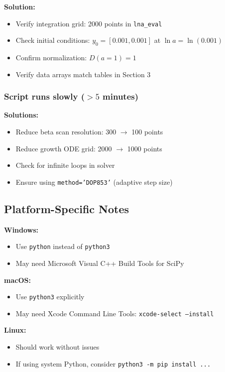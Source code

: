\documentclass[11pt]{article}
\begin{document}
\textbf{Solution:}
\begin{itemize}
    \item Verify integration grid: 2000 points in \texttt{lna\_eval}
    \item Check initial conditions: $y_0 = [0.001, 0.001]$ at $\ln a = \ln(0.001)$
    \item Confirm normalization: $D(a=1) = 1$
    \item Verify data arrays match tables in Section 3
\end{itemize}

\subsubsection{Script runs slowly ($>5$ minutes)}

\textbf{Solutions:}
\begin{itemize}
    \item Reduce beta scan resolution: 300 $\to$ 100 points
    \item Reduce growth ODE grid: 2000 $\to$ 1000 points
    \item Check for infinite loops in solver
    \item Ensure using \texttt{method='DOP853'} (adaptive step size)
\end{itemize}

\subsection{Platform-Specific Notes}

\textbf{Windows:}
\begin{itemize}
    \item Use \texttt{python} instead of \texttt{python3}
    \item May need Microsoft Visual C++ Build Tools for SciPy
\end{itemize}

\textbf{macOS:}
\begin{itemize}
    \item Use \texttt{python3} explicitly
    \item May need Xcode Command Line Tools: \texttt{xcode-select --install}
\end{itemize}

\textbf{Linux:}
\begin{itemize}
    \item Should work without issues
    \item If using system Python, consider \texttt{python3 -m pip install ...}
\end{itemize}
\end{document}
